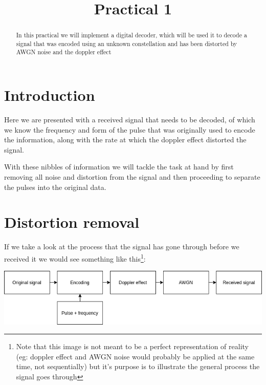 \documentclass[conference,9pt]{IEEEtran}
\begin{document}
%
\title{Practical 1}

\author{
}


\maketitle
\begin{abstract}
  In this practical we will implement a digital decoder, which will be used it to decode a signal that was encoded using an unknown constellation and has been distorted by AWGN noise and the doppler effect
\end{abstract}



\section{Introduction}
Here we are presented with a received signal that needs to be decoded, of which we know the frequency and form of the pulse that was originally used to encode the information, along with the rate at which the doppler effect distorted the signal.

With these nibbles of information we will tackle the task at hand by first removing all noise and distortion from the signal and then proceeding to separate the pulses into the original data.

\section{Distortion removal}
If we take a look at the process that the signal has gone through before we received it we would see something like this\footnote{Note that this image is not meant to be a perfect representation of reality (eg: doppler effect and AWGN noise would probably be applied at the same time, not sequentially) but it's purpose is to illustrate the general process the signal goes through}:

\vspace{5mm}
\includegraphics[scale=0.35]{initial-process.png}
\vspace{5mm}
\end{document}
